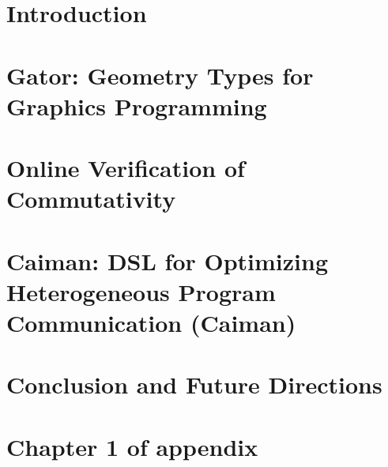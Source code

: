 \documentclass[phd,tocprelim]{cornell}
\begin{document}
\chapter{Introduction}



\chapter{Gator: Geometry Types for Graphics Programming}



\chapter{Online Verification of Commutativity}



\chapter{Caiman: DSL for Optimizing Heterogeneous Program Communication (Caiman)}



\chapter{Conclusion and Future Directions}


\appendix
\chapter{Chapter 1 of appendix}



\end{document}
